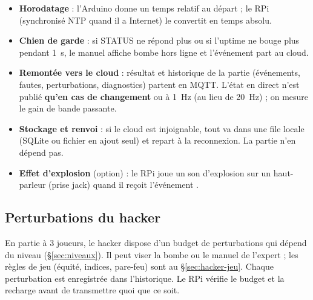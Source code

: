 \documentclass[11pt,a4paper]{article}
\newcommand{\code}[1]{\texttt{\detokenize{#1}}}
\begin{document}
\begin{itemize}
  \item \textbf{Horodatage} : l'Arduino donne un temps relatif au départ ; le RPi (synchronisé NTP quand il a Internet) le convertit en temps absolu.
  \item \textbf{Chien de garde} : si STATUS ne répond plus ou si l'uptime ne bouge plus pendant 1~s, le manuel affiche \og bombe hors ligne\fg{} et l'événement \code{BOMB_OFFLINE} part au cloud.
  \item \textbf{Remontée vers le cloud} : résultat et historique de la partie (événements, fautes, perturbations, diagnostics) partent en MQTT. L'état en direct n'est publié \textbf{qu'en cas de changement} ou à 1~Hz (au lieu de 20~Hz) ; on mesure le gain de bande passante.
  \item \textbf{Stockage et renvoi} : si le cloud est injoignable, tout va dans une file locale (SQLite ou fichier en ajout seul) et repart à la reconnexion. La partie n'en dépend pas.
  \item \textbf{Effet d'explosion} (option) : le RPi joue un son d'explosion sur un haut-parleur (prise jack) quand il reçoit l'événement \code{EXPLODED}.
\end{itemize}

\subsection{Perturbations du hacker}
\label{sec:perturbations}

En partie à 3 joueurs, le hacker dispose d'un budget de perturbations qui dépend du niveau (\S\ref{sec:niveaux}). Il peut viser la bombe ou le manuel de l'expert ; les règles de jeu (équité, indices, pare-feu) sont au \S\ref{sec:hacker-jeu}. Chaque perturbation est enregistrée dans l'historique. Le RPi vérifie le budget et la recharge avant de transmettre quoi que ce soit.
\end{document}
